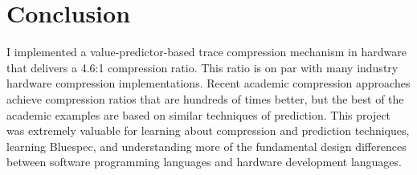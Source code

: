 \documentclass[conference]{IEEEtran}
\begin{document}
\section{Conclusion}
I implemented a value-predictor-based trace compression mechanism in hardware that delivers a 4.6:1 compression ratio. This ratio is on par with many industry hardware compression implementations. Recent academic compression approaches achieve compression ratios that are hundreds of times better, but the best of the academic examples are based on similar techniques of prediction. This project was extremely valuable for learning about compression and prediction techniques, learning Bluespec, and understanding more of the fundamental design differences between software programming languages and hardware development languages. 









\end{document}
